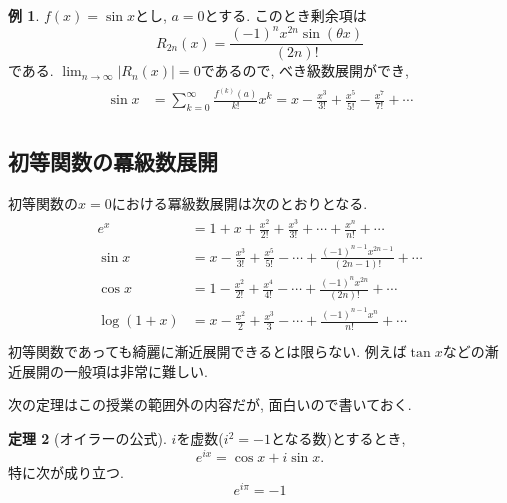 \documentclass[dvipdfmx,a4paper,11pt]{article}
\theoremstyle{definition}
\newtheorem{thm}{定理}
\newtheorem{exa}[thm]{例}
\begin{document}
  \begin{exa}
 $f(x)=\sin x$とし, $a=0$とする. このとき剰余項は
 $$
 R_{2n}(x) = \frac{(-1)^{n}x^{2n} \sin ( \theta x) }{(2n)!}
 $$
 である. $\lim_{n \rightarrow \infty}|R_n(x)| =0$であるので, べき級数展開ができ, 
\begin{align*}
\begin{split}
\sin x&= \sum_{k=0}^{ \infty }\frac{f^{(k)}(a)}{k!}x^k = 
 x - \frac{x^3}{3!} + \frac{x^5}{5!} -  \frac{x^7}{7!} +  \cdots 
\end{split}
\end{align*}
 \end{exa}
 
 \subsection{初等関数の冪級数展開}

 初等関数の$x=0$における冪級数展開は次のとおりとなる. 
\begin{align*}
\begin{split}
e^x &= 1 + x+  \frac{x^2}{2!} + \frac{x^3}{3!}  + \cdots  + 
 \frac{ x^{n}}{n!} + \cdots \\
\sin x &= x - \frac{x^3}{3!} + \frac{x^5}{5!} - \cdots  + 
 \frac{(-1)^{n-1} x^{2n-1}}{(2n-1)!} 
 +\cdots \\
 \cos x &= 1 - \frac{x^2}{2!} + \frac{x^4}{4!} - \cdots  + 
 \frac{(-1)^{n} x^{2n}}{(2n)!} 
 + \cdots\\
 \log(1+x) &= x - \frac{x^2}{2} + \frac{x^3}{3}  - \cdots   
 + \frac{ (-1)^{n-1}x^{n}}{n!} + \cdots \\
\end{split}
\end{align*}
初等関数であっても綺麗に漸近展開できるとは限らない. 例えば$\tan x$などの漸近展開の一般項は非常に難しい.
 
次の定理はこの授業の範囲外の内容だが, 面白いので書いておく. 
\begin{tcolorbox}[
    colback = white,
    colframe = green!35!black,
    fonttitle = \bfseries,
    breakable = true]
    \begin{thm}[オイラーの公式]
$i$を虚数($i^2=-1$となる数)とするとき, 
$$
e^{ix} = \cos x + i \sin x.
$$
特に次が成り立つ.
$$
e^{i \pi} =-1
$$
    \end{thm}
 \end{tcolorbox}
 
\end{document}
